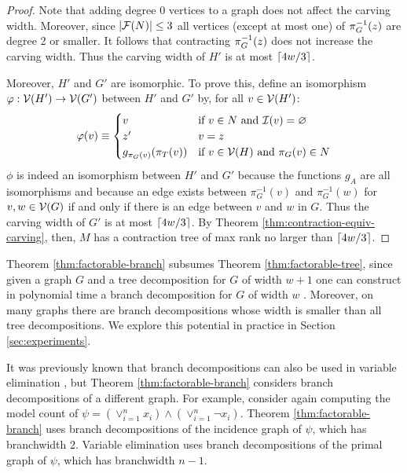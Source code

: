 \begin{proof}
Note that adding degree 0 vertices to a graph does not affect the carving width. Moreover, since $|\mathcal{F}(N)| \leq 3$ all vertices (except at most one) of $\pi_G^{-1}(z)$ are degree 2 or smaller. It follows that contracting $\pi_G^{-1}(z)$ does not increase the carving width. Thus the carving width of $H'$ is at most $\lceil4w/3\rceil$.

Moreover, $H'$ and $G'$ are isomorphic. To prove this, define an isomorphism $\varphi: \mathcal{V}(H') \rightarrow \mathcal{V}(G')$ between $H'$ and $G'$ by, for all $v \in \mathcal{V}(H')$:
$$\varphi(v) \equiv \begin{cases}v&\text{if}~v \in N~\text{and}~\mathcal{I}(v)=\varnothing\\z'&v=z\\g_{\pi_G(v)}(\pi_T(v))&\text{if}~v \in \mathcal{V}(H)~\text{and}~\pi_G(v) \in N\end{cases}$$
$\phi$ is indeed an isomorphism between $H'$ and $G'$ because the functions $g_A$ are all isomorphisms and because an edge exists between $\pi_G^{-1}(v)$ and $\pi_G^{-1}(w)$ for $v, w \in \mathcal{V}(G)$ if and only if there is an edge between $v$ and $w$ in $G$. Thus the carving width of $G'$ is at most $\lceil4w/3\rceil$. By Theorem \ref{thm:contraction-equiv-carving}, then, $M$ has a contraction tree of max rank no larger than $\lceil4w/3\rceil$.
\end{proof}

Theorem \ref{thm:factorable-branch} subsumes Theorem \ref{thm:factorable-tree}, since given a graph $G$ and a tree decomposition for $G$ of width $w+1$ one can construct in polynomial time a branch decomposition for $G$ of width $w$ \cite{RS91}. Moreover, on many graphs there are branch decompositions whose width is smaller than all tree decompositions. We explore this potential in practice in Section \ref{sec:experiments}.

It was previously known that branch decompositions can also be used in variable elimination \cite{BDP09}, but Theorem \ref{thm:factorable-branch} considers branch decompositions of a different graph. For example, consider again computing the model count of $\psi = \left(\lor_{i=1}^n x_i\right) \land \left(\lor_{i=1}^n \neg x_i\right)$. Theorem \ref{thm:factorable-branch} uses branch decompositions of the incidence graph of $\psi$, which has branchwidth 2. Variable elimination uses branch decompositions of the primal graph of $\psi$, which has branchwidth $n-1$. 